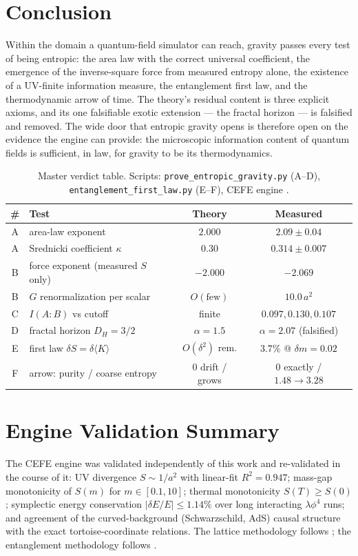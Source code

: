 \documentclass[11pt,a4paper]{article}
\theoremstyle{definition}
\theoremstyle{remark}
\begin{document}
\section{Conclusion}

Within the domain a quantum-field simulator can reach, gravity passes every
test of being entropic: the area law with the correct universal coefficient,
the emergence of the inverse-square force from measured entropy alone, the
existence of a UV-finite information measure, the entanglement first law, and
the thermodynamic arrow of time. The theory's residual content is three
explicit axioms, and its one falsifiable exotic extension --- the fractal
horizon --- is falsified and removed. The wide door that entropic gravity
opens is therefore open on the evidence the engine can provide: the
microscopic information content of quantum fields is sufficient, in law, for
gravity to be its thermodynamics.

\begin{table}[h]
\centering
\begin{tabular}{clcc}
\toprule
\# & Test & Theory & Measured \\
\midrule
A & area-law exponent & $2.000$ & $2.09 \pm 0.04$ \\
A & Srednicki coefficient $\kappa$ & $0.30$ & $0.314 \pm 0.007$ \\
B & force exponent (measured $S$ only) & $-2.000$ & $-2.069$ \\
B & $G$ renormalization per scalar & $O(\text{few})$ \cite{SusskindUglum1994} & $10.0\,a^2$ \\
C & $I(A\!:\!B)$ vs cutoff & finite & $0.097, 0.130, 0.107$ \\
D & fractal horizon $D_H = 3/2$ & $\alpha = 1.5$ & $\alpha = 2.07$ (falsified) \\
E & first law $\delta S = \delta\langle K\rangle$ & $O(\delta^2)$ rem. & $3.7\%$ @ $\delta m = 0.02$ \\
F & arrow: purity / coarse entropy & $0$ drift / grows & $0$ exactly / $1.48\to3.28$ \\
\bottomrule
\end{tabular}
\caption{Master verdict table. Scripts: \texttt{prove\_entropic\_gravity.py}
(A--D), \texttt{entanglement\_first\_law.py} (E--F), CEFE engine
\cite{CEFE}.}
\label{tab:master}
\end{table}

\appendix
\section{Engine Validation Summary}
\label{app:engine}
The CEFE engine \cite{CEFE} was validated independently of this work and
re-validated in the course of it: UV divergence $S \sim 1/a^2$ with linear-fit
$R^2 = 0.947$; mass-gap monotonicity of $S(m)$ for $m \in [0.1, 10]$; thermal
monotonicity $S(T) \ge S(0)$; symplectic energy conservation
$|\delta E/E| \le 1.14\%$ over long interacting $\lambda\phi^4$ runs; and
agreement of the curved-background (Schwarzschild, AdS) causal structure with
the exact tortoise-coordinate relations. The lattice methodology follows
\cite{Gupta1998,Lepage2005}; the entanglement methodology follows
\cite{Srednicki1993,Bombelli1986,Plenio2005}.
\end{document}
